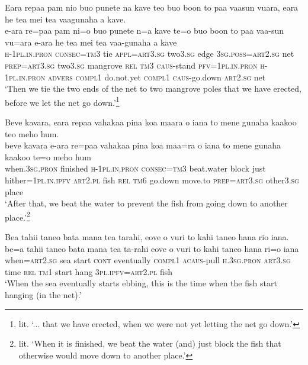 \ea\label{ex:text24-8}
Eara repaa pam nio buo punete na kave teo buo boon to paa vaasun vuara, eara he tea mei tea vaagunaha a kave.\\
\gll e-ara	re=paa	pam	ni=o	buo	punete	n=a	kave	te=o	buo	boon	to	paa	vaa-sun	vu=ara	e-ara	he	tea	mei	tea	vaa-gunaha	a	kave\\
     \textsc{h}-1\textsc{pl}.\textsc{in}.\textsc{pron}	\textsc{consec}=\textsc{tm}3	tie	\textsc{appl}=\textsc{art}3.\textsc{sg}	two3.\textsc{sg}	edge	3\textsc{sg}.\textsc{poss}=\textsc{art}2.\textsc{sg}	net	\textsc{prep}=\textsc{art}3.\textsc{sg}	two3.\textsc{sg}	mangrove	\textsc{rel}	\textsc{tm}3	\textsc{caus}-stand	\textsc{pfv}=1\textsc{pl}.\textsc{in}.\textsc{pron}	\textsc{h}-1\textsc{pl}.\textsc{in}.\textsc{pron}	\textsc{advers}	\textsc{compl}1	do.not.yet	\textsc{compl}1	\textsc{caus}-go.down	\textsc{art}2.\textsc{sg}	net\\
\glt `Then we tie the two ends of the net to two mangrove poles that we have erected, before we let the net go down.'\footnote{lit. `... that we have erected, when we were not yet letting the net go down.'}
\z

\ea\label{ex:text24-9}
Beve kavara, eara repaa vahakaa pina koa maara o iana to mene gunaha kaakoo teo meho hum.\\
\gll beve	kavara	e-ara	re=paa	vahakaa	pina	koa	maa=ra	o	iana	to	mene	gunaha	kaakoo	te=o	meho	hum\\
     when.3\textsc{sg}.\textsc{pron}	finished	\textsc{h}-1\textsc{pl}.\textsc{in}.\textsc{pron}	\textsc{consec}=\textsc{tm}3	beat.water	block	just	hither=1\textsc{pl}.\textsc{in}.\textsc{ipfv}	\textsc{art}2.\textsc{pl}	fish	\textsc{rel}	\textsc{tm}6	go.down	move.to	\textsc{prep}=\textsc{art}3.\textsc{sg}	other3.\textsc{sg}	place\\
\glt `After that, we beat the water to prevent the fish from going down to another place.'\footnote{lit. `When it is finished, we beat the water (and) just block the fish that otherwise would move down to another place.'}
\z

\ea\label{ex:text24-10}
Bea tahii taneo bata mana tea tarahi, eove o vuri to kahi taneo hana rio iana.\\
\gll be=a	tahii	taneo	bata	mana	tea	ta-rahi	eove	o	vuri	to	kahi	taneo	hana	ri=o	iana\\
     when=\textsc{art}2.\textsc{sg}	sea	start	\textsc{cont}	eventually	\textsc{compl}1	\textsc{acaus}-pull	\textsc{h}.3\textsc{sg}.\textsc{pron}	\textsc{art}3.\textsc{sg}	time	\textsc{rel}	\textsc{tm}1	start	hang	3\textsc{pl}.\textsc{ipfv}=\textsc{art}2.\textsc{pl}	fish\\
\glt `When the sea eventually starts ebbing, this is the time when the fish start hanging (in the net).'
\z

